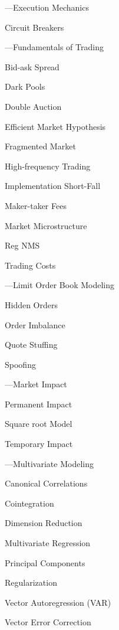 \begin{minipage}{0.40\textwidth}
\noindent ---Execution Mechanics
	\begin{flushright}
	Circuit Breakers	
	\end{flushright}


\noindent ---Fundamentals of Trading 
	\begin{flushright}
	Bid-ask Spread \par
	Dark Pools \par
	Double Auction \par
	Efficient Market Hypothesis \par
	Fragmented Market \par
	High-frequency Trading \par
	Implementation Short-Fall \par
	Maker-taker Fees \par
	Market Microstructure \par
	Reg NMS \par
	Trading Costs
	\end{flushright}


\noindent ---Limit Order Book Modeling
	\begin{flushright}
	Hidden Orders \par
	Order Imbalance \par
	Quote Stuffing \par
	Spoofing
	\end{flushright}


\noindent ---Market Impact
	\begin{flushright}
	Permanent Impact \par
	Square root Model \par
	Temporary Impact
	\end{flushright}


\noindent ---Multivariate Modeling
	\begin{flushright}
	Canonical Correlations \par
	Cointegration \par
	Dimension Reduction \par
	Multivariate Regression \par
	Principal Components \par
	Regularization \par
	Vector Autoregression (VAR) \par
	Vector Error Correction
	\end{flushright}

\vfill
\end{minipage} \newpage
